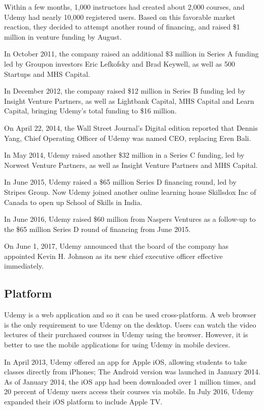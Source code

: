 Within a few months, 1,000 instructors had created about 2,000 courses, and Udemy had nearly 10,000 registered users. Based on this favorable market reaction, they decided to attempt another round of financing, and raised \$1 million in venture funding by August.

In October 2011, the company raised an additional \$3 million in Series A funding led by Groupon investors Eric Lefkofsky and Brad Keywell, as well as 500 Startups and MHS Capital.

In December 2012, the company raised \$12 million in Series B funding led by Insight Venture Partners, as well as Lightbank Capital, MHS Capital and Learn Capital, bringing Udemy's total funding to \$16 million.

On April 22, 2014, the Wall Street Journal's Digital edition reported that Dennis Yang, Chief Operating Officer of Udemy was named CEO, replacing Eren Bali.

In May 2014, Udemy raised another \$32 million in a Series C funding, led by Norwest Venture Partners, as well as Insight Venture Partners and MHS Capital.

In June 2015, Udemy raised a \$65 million Series D financing round, led by Stripes Group. Now Udemy joined another online learning house Skillsdox Inc of Canada to open up School of Skills in India.

In June 2016, Udemy raised \$60 million from Naspers Ventures as a follow-up to the \$65 million Series D round of financing from June 2015.

On June 1, 2017, Udemy announced that the board of the company has appointed Kevin H. Johnson as its new chief executive officer effective immediately.

\subsection{Platform}

Udemy is a web application and so it can be used cross-platform. A web browser is the only requirement to use Udemy on the desktop. Users can watch the video lectures of their purchased courses in Udemy using the browser. However, it is better to use the mobile applications for using Udemy in mobile devices.

In April 2013, Udemy offered an app for Apple iOS, allowing students to take classes directly from iPhones; The Android version was launched in January 2014. As of January 2014, the iOS app had been downloaded over 1 million times, and 20 percent of Udemy users access their courses via mobile. In July 2016, Udemy expanded their iOS platform to include Apple TV.

